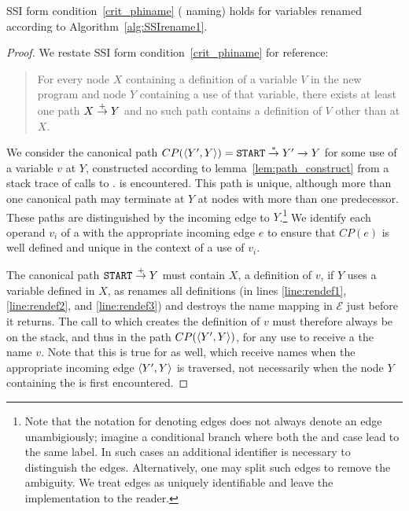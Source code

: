 \documentclass[12pt,titlepage,twoside]{article}
\begin{document}
\begin{lemma}\label{lem:renamephi}
SSI form condition~\ref{crit_phiname} (\phifunction{} naming) holds
for variables renamed according to Algorithm~\ref{alg:SSIrename1}.
\end{lemma}
\begin{proof}
We restate SSI form condition~\ref{crit_phiname} for reference:
\begin{quote}
For every node $X$ containing a definition of a variable $V$ in
the new program and node $Y$ containing a use of that variable, there
exists at least one path $X \stackrel{+}{\rightarrow} Y$ and no such path contains a
definition of $V$ other than at $X$.
\end{quote}
We consider the canonical path 
$CP(\left\langle Y',Y \right\rangle)=\texttt{START}\stackrel{*}{\rightarrow} Y' \rightarrow Y$
for some use of a variable $v$ at $Y$, constructed according to
lemma~\ref{lem:path_construct} 
from a stack trace of calls to .
is encountered.  This path is unique, although more than one canonical
path may terminate at $Y$ at nodes with more than one predecessor.
These paths are distinguished by the incoming edge to
$Y$.\footnote{Note that the notation  for denoting edges
does not always denote an edge unambigiously; imagine a conditional
branch where both the  and  case lead to the
same label.  In such cases an additional identifier is necessary to
distinguish the edges.  Alternatively, one may split such edges to
remove the ambiguity.  We treat edges as uniquely identifiable and
leave the implementation to the reader.}  We identify each operand
$v_i$ of a \phifunction{} with the appropriate incoming edge $e$ to
ensure that $CP(e)$ is well defined and unique in the context of a
use of $v_i$.

The canonical path $\texttt{START}\stackrel{+}{\rightarrow} Y$ must contain $X$, a definition of
$v$, if $Y$ uses a variable defined in $X$, as  renames
all definitions (in lines \ref{line:rendef1}, \ref{line:rendef2}, and
\ref{line:rendef3}) and destroys the name mapping in $\mathcal{E}$
just before it returns.  The call to  which creates the
definition of $v$ must therefore always be on the stack, and thus in
the path $CP(\left\langle Y',Y \right\rangle)$, for any use to receive a the name $v$.
Note that this is
true for  as well, which receive names when the
appropriate incoming edge $\left\langle Y',Y \right\rangle$ is traversed, not necessarily
when the node $Y$ containing the \phifunction{} is first encountered.


\end{proof}
\end{document}
